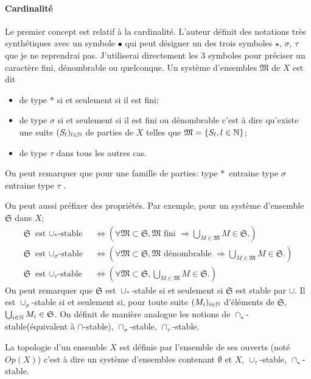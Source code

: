\paragraph{Cardinalité}
Le premier concept est relatif à la cardinalité. L'auteur définit des notations très synthétiques avec un symbole $\bullet$ qui peut  désigner un des trois symboles $\star$, $\sigma$, $\tau$ que je ne reprendrai pas. J'utiliserai directement les 3 symboles pour préciser un caractère fini, dénombrable ou quelconque.\newline
Un système d'ensembles $\mathfrak{M}$ de $X$ est dit
\begin{itemize}
 \item de type $*$ si et seulement si il est fini;
 \item de type $\sigma$ si et seulement si il est fini ou dénombrable c'est à dire qu'existe une suite $(S_l)_{l\in \mathbb{N}}$ de parties de $X$ telles que $\mathfrak{M}= \left\lbrace S_l , l\in \mathbb{N} \right\rbrace$;
 \item de type $\tau$ dans tous les autres cas.
\end{itemize}
On peut remarquer que pour une famille de parties: \og type $*$\fg\, entraine \og type $\sigma$ \fg \, entraine \og type $\tau$ \fg.

On peut aussi préfixer des propriétés. Par exemple, pour un système d'ensemble $\mathfrak{S}$ dans $X$;
\begin{align*}
\mathfrak{S} \text{ est $\cup_*$-stable } &\Leftrightarrow \left( \forall \mathfrak{M} \subset \mathfrak{S}, \mathfrak{M} \text{ fini } \Rightarrow \bigcup_{M \in \mathfrak{M}}M \in \mathfrak{S}.\right) \\
\mathfrak{S} \text{ est $\cup_\sigma$-stable } &\Leftrightarrow \left( \forall \mathfrak{M} \subset \mathfrak{S}, \mathfrak{M} \text{ dénombrable } \Rightarrow \bigcup_{M \in \mathfrak{M}}M \in \mathfrak{S}.\right) \\
\mathfrak{S} \text{ est $\cup_\tau$-stable } &\Leftrightarrow \left( \forall \mathfrak{M} \subset \mathfrak{S}, \bigcup_{M \in \mathfrak{M}}M \in \mathfrak{S}.\right)
\end{align*}
On peut remarquer que $\mathfrak{S}$ est $\cup_*$-stable si et seulement si $\mathfrak{S}$ est stable par $\cup$. Il est $\cup_\sigma$-stable si et seulement si, pour toute suite $(M_i)_{i\in \mathbb{N}}$ d'éléments de $\mathfrak{S}$, $\bigcup_{i\in \mathbb{N}}M_i \in \mathfrak{S}$.\newline
On définit de manière analogue les notions de $\cap_\star$-stable(équivalent à $\cap$-stable), $\cap_\sigma$-stable, $\cap_\tau$-stable.
\begin{rem}
 La topologie d'un ensemble $X$ est définie par l'ensemble de ses ouverts (noté $Op(X)$) c'est à dire un système d'ensembles contenant $\emptyset$ et $X$, $\cup_\tau$-stable, $\cap_\star$-stable.
\end{rem}

